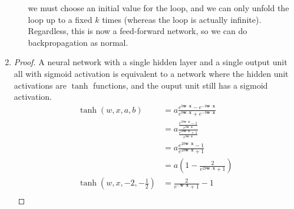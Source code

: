 \documentclass[12pt]{article}
\begin{document}
\begin{enumerate}
\begin{enumerate}
        we must choose an initial value for the loop, and we can only unfold
        the loop up to a fixed $k$ times (whereas the loop is actually
        infinite). Regardless, this is now a feed-forward network, so we can
        do backpropagation as normal.\\
    \end{enumerate}
  \item
    \begin{proof} A neural network with a single hidden layer and a single
      output unit all with sigmoid activation is equivalent to a network where
      the hidden unit activations are $\tanh$ functions, and the ouput unit
      still has a sigmoid activation.\\

      \begin{equation}
        \begin{split}
          \tanh(w,x,a,b)&=a\frac{e^{b\boldsymbol{w}\cdot \boldsymbol{x}}-
                                 e^{-b\boldsymbol{w}\cdot\boldsymbol{x}}}
                                {e^{b\boldsymbol{w}\cdot\boldsymbol{x}}+
                                 e^{-b\boldsymbol{w}\cdot\boldsymbol{x}}}\\
          &=a\frac{\frac{e^{2b\boldsymbol{w}\cdot \boldsymbol{x}}-1}
                   {e^{b\boldsymbol{w}\cdot\boldsymbol{x}}}}
                  {\frac{e^{2b\boldsymbol{w}\cdot\boldsymbol{x}}+1}
                   {e^{b\boldsymbol{w}\cdot\boldsymbol{x}}}}\\
          &=a\frac{e^{2b\boldsymbol{w}\cdot \boldsymbol{x}}-1}
                  {e^{2b\boldsymbol{w}\cdot\boldsymbol{x}}+1}\\
          &=a\left(1-\frac{2}
                         {e^{2b\boldsymbol{w}\cdot\boldsymbol{x}}+1}\right)\\
          \tanh(w,x,-2,-\frac{1}{2})&=
            \frac{2}
                 {e^{-\boldsymbol{w}\cdot\boldsymbol{x}}+1}-1\\
        \end{split}
      \end{equation}


\end{proof}
\end{enumerate}
\end{document}
